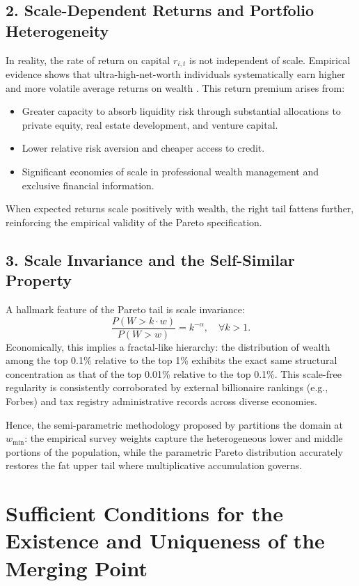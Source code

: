 \subsection*{2. Scale-Dependent Returns and Portfolio Heterogeneity}
In reality, the rate of return on capital $r_{i, t}$ is not independent of scale. Empirical evidence shows that ultra-high-net-worth individuals systematically earn higher and more volatile average returns on wealth \citep{fagereng2020heterogeneity}. This return premium arises from:
\begin{itemize}
    \item Greater capacity to absorb liquidity risk through substantial allocations to private equity, real estate development, and venture capital.
    \item Lower relative risk aversion and cheaper access to credit.
    \item Significant economies of scale in professional wealth management and exclusive financial information.
\end{itemize}
When expected returns scale positively with wealth, the right tail fattens further, reinforcing the empirical validity of the Pareto specification.

\subsection*{3. Scale Invariance and the Self-Similar Property}
A hallmark feature of the Pareto tail is scale invariance:
\begin{equation}
    \frac{P(W > k \cdot w)}{P(W > w)} = k^{-\alpha}, \quad \forall k > 1.
\end{equation}
Economically, this implies a fractal-like hierarchy: the distribution of wealth among the top 0.1\% relative to the top 1\% exhibits the exact same structural concentration as that of the top 0.01\% relative to the top 0.1\%. This scale-free regularity is consistently corroborated by external billionaire rankings (e.g., Forbes) and tax registry administrative records across diverse economies.

Hence, the semi-parametric methodology proposed by \citet{vermeulen2018} partitions the domain at $w_{\min}$: the empirical survey weights capture the heterogeneous lower and middle portions of the population, while the parametric Pareto distribution accurately restores the fat upper tail where multiplicative accumulation governs.


\newpage

\section{Sufficient Conditions for the Existence and Uniqueness of the Merging Point}\label{app:merging-point-proof}

